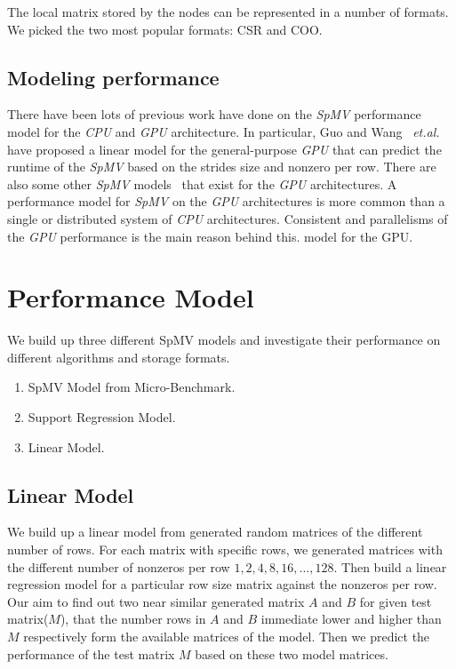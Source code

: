 \documentclass[conference, 10ppt]{IEEEtran}
\begin{document}
The local matrix stored by the nodes can be represented in a number of
formats. We picked the two most popular formats: CSR and COO.

\subsection{Modeling performance}

There have been lots of previous work have done on the \textit{SpMV}
performance model for the \textit{CPU} and \textit{GPU}
architecture. In particular, Guo and Wang~\cite{guo2013performance}
\textit{et.al.} have proposed a linear model for the general-purpose
\textit{GPU} that can predict the runtime of the \textit{SpMV} based
on the strides size and nonzero per row. There are also some other
\textit{SpMV} models~\cite{nisa2018effective,guo2018performance} that
exist for the \textit{GPU} architectures. A performance model for
\textit{SpMV} on the \textit{GPU} architectures is more common than a
single or distributed system of \textit{CPU} architectures. Consistent
and parallelisms of the \textit{GPU} performance is the main reason
behind this.
model for the GPU. 


\section{Performance Model}
We build up three different SpMV models and investigate their performance on different algorithms and
storage formats.
\begin{enumerate}
\item SpMV Model from Micro-Benchmark.
\item Support Regression Model.
\item Linear Model.
\end{enumerate} 

\subsection{Linear Model}
\label{sec:linear-2d-spmv}
We build up a linear model from generated random matrices of the different
number of rows. For each matrix with specific rows, we generated
matrices with the different number of nonzeros per row $1, 2, 4, 8, 16,
\dots, 128$. Then build a linear regression model for a particular row
size matrix against the nonzeros per row. Our aim to find out two near
similar generated matrix $A$ and $B$ for given test matrix($M$), that
the number rows in $A$ and $B$ immediate lower and higher than $M$
respectively form the available matrices of the model. Then we predict
the performance of the test matrix $M$ based on these two model
matrices.
\end{document}
